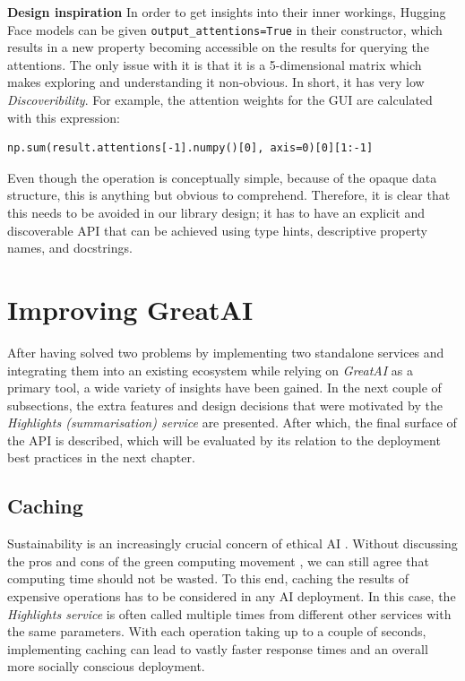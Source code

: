 \begin{displayquote}
\textbf{Design inspiration} In order to get insights into their inner workings, Hugging Face models can be given \texttt{output\_attentions=True} in their constructor, which results in a new property becoming accessible on the results for querying the attentions. The only issue with it is that it is a 5-dimensional matrix which makes exploring and understanding it non-obvious. In short, it has very low \textit{Discoveribility}. For example, the attention weights for the GUI are calculated with this expression:
\begin{verbatim}
np.sum(result.attentions[-1].numpy()[0], axis=0)[0][1:-1]
\end{verbatim}
Even though the operation is conceptually simple, because of the opaque data structure, this is anything but obvious to comprehend. Therefore, it is clear that this needs to be avoided in our library design; it has to have an explicit and discoverable API that can be achieved using type hints, descriptive property names, and docstrings.
\end{displayquote}

\section{Improving GreatAI}

After having solved two problems by implementing two standalone services and integrating them into an existing ecosystem while relying on \textit{GreatAI} as a primary tool, a wide variety of insights have been gained. In the next couple of subsections, the extra features and design decisions that were motivated by the \textit{Highlights (summarisation) service} are presented. After which, the final surface of the API is described, which will be evaluated by its relation to the deployment best practices \cite{serban2020adoption,serban2021practices,john2020architecting,john2020ai} in the next chapter.

\subsection{Caching}

Sustainability is an increasingly crucial concern of ethical AI \cite{van2021sustainable}. Without discussing the pros and cons of the green computing movement \cite{10.1145/1400181.1400186}, we can still agree that computing time should not be wasted. To this end, caching the results of expensive operations has to be considered in any AI deployment. In this case, the \textit{Highlights service} is often called multiple times from different other services with the same parameters. With each operation taking up to a couple of seconds, implementing caching can lead to vastly faster response times and an overall more socially conscious deployment.

